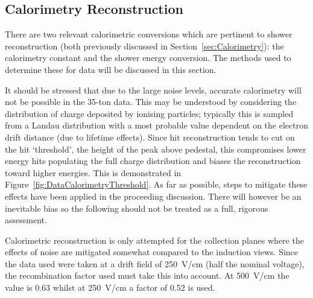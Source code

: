 \subsection{Calorimetry Reconstruction}\label{sec:DataCalorimetryReconstruction}

There are two relevant calorimetric conversions which are pertinent to shower reconstruction (both previously discussed in Section~\ref{sec:Calorimetry}): the calorimetry constant and the shower energy conversion.  The methods used to determine these for data will be discussed in this section.

It should be stressed that due to the large noise levels, accurate calorimetry will not be possible in the 35-ton data.  This may be understood by considering the distribution of charge deposited by ionising particles; typically this is sampled from a Landau distribution with a most probable value dependent on the electron drift distance (due to lifetime effects).  Since hit reconstruction tends to cut on the hit `threshold', the height of the peak above pedestal, this compromises lower energy hits populating the full charge distribution and biases the reconstruction toward higher energies.  This is demonstrated in Figure~\ref{fig:DataCalorimetryThreshold}.  As far as possible, steps to mitigate these effects have been applied in the proceeding discussion.  There will however be an inevitable bias so the following should not be treated as a full, rigorous assessment.

Calorimetric reconstruction is only attempted for the collection planes where the effects of noise are mitigated somewhat compared to the induction views.  Since the data used were taken at a drift field of 250~V/cm (half the nominal voltage), the recombination factor used must take this into account.  At 500~V/cm the value is 0.63 whilst at 250~V/cm a factor of 0.52 is used.

